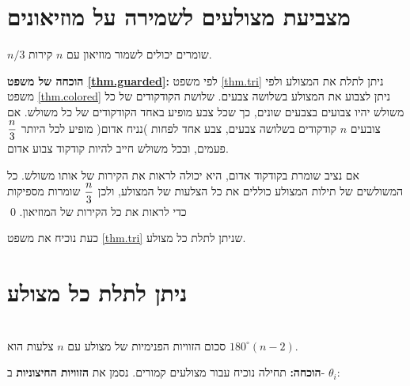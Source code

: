 \section{מצביעת מצולעים לשמירה על מוזיאונים}

\begin{theorem}
$n/3$
שומרים יכולים לשמור מוזיאון עם 
$n$
קירות.
\end{theorem}

\textbf{הוכחה של משפט
\ref{thm.guarded}:}
לפי משפט
\ref{thm.tri}
ניתן לתלת את המצולע ולפי משפט
\ref{thm.colored}
ניתן לצבוע את המצולע בשלושה צבעים. שלושת הקודקודים של כל משולש יהיו צבועים בצבעים שונים, כך שכל צבע מופיע באחד הקודקודים של כל משולש. אם צובעים 
$n$
קודקודים בשלושה צבעים, צבע אחד לפחות )נניח אדום( מופיע לכל היותר
$\displaystyle\frac{n}{3}$
פעמים, ובכל משולש חייב להיות קודקוד צבוע אדום.

אם נציב שומרת בקודקוד אדום, היא יכולה לראות את הקירות של אותו משולש. כל המשולשים של תילות המצולע כוללים את כל הצלעות של המצולע, ולכן
$\displaystyle\frac{n}{3}$
שומרות מספיקות כדי לראות את כל הקירות של המוזיאון.
\qed

כעת נוכיח את משפט
\ref{thm.tri}
שניתן לתלת כל מצולע.

\section{ניתן לתלת כל מצולע}

\begin{theorem}\label{thm.interior-angles-of-a-polygon}\mbox{}\\
סכום הזוויות הפנימיות של מצולע עם
$n$
צלעות הוא
$180^\circ(n-2)$.
\end{theorem}



\textbf{הוכחה:}
תחילה נוכיח עבור מצולעים קמורים. נסמן את 
\textbf{הזוויות החיצוניות}
ב-%
$\theta_i$:

\begin{figure}
\begin{center}

\end{center}
\caption{}\label{}
\end{figure}

